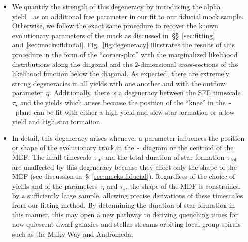 \documentclass[ms.tex]{subfiles}
\begin{document}
\begin{itemize}
	\item We quantify the strength of this degeneracy by introducing the alpha
	yield~\yacc~as an additional free parameter in our fit to our fiducial
	mock sample.
	Otherwise, we follow the exact same procedure to recover the known
	evolutionary parameters of the mock as discussed
	in~\S\S~\ref{sec:fitting} and~\ref{sec:mocks:fiducial}.
	Fig.~\ref{fig:degeneracy} illustrates the results of this procedure in the
	form of the ``corner-plot'' with the marginalized likelihood distributions
	along the diagonal and the 2-dimensional cross-sections of the likelihood
	function below the diagonal.
	As expected, there are extremely strong degeneracies in all yields with
	one another and with the outflow parameter~$\eta$.
	Additionally, there is a degeneracy between the SFE timescale~$\tau_\star$
	and the yields which arises because the position of the ``knee'' in
	the~\afe-\feh~plane can be fit with either a high-yield and slow star
	formation or a low yield and high star formation.

	\item In detail, this degeneracy arises whenever a parameter influences
	the position or shape of the evolutionary track in the~\afe-\feh~diagram
	or the centroid of the MDF.
	The infall timescale~$\tau_\text{in}$ and the total duration of star
	formation~$\tau_\text{tot}$ are unaffected by this degeneracy because they
	effect only the shape of the MDF (see discussion
	in~\S~\ref{sec:mocks:fiducial}).
	Regardless of the choice of yields and of the parameters~$\eta$ and
	$\tau_\star$, the shape of the MDF is constrained by a sufficiently large
	sample, allowing precise derivations of these timescales from our fitting
	method.
	By determining the duration of star formation in this manner, this may
	open a new pathway to deriving quenching times for now quiescent dwarf
	galaxies and stellar streams orbiting local group spirals such as the
	Milky Way and Andromeda.

\end{itemize}
\end{document}
